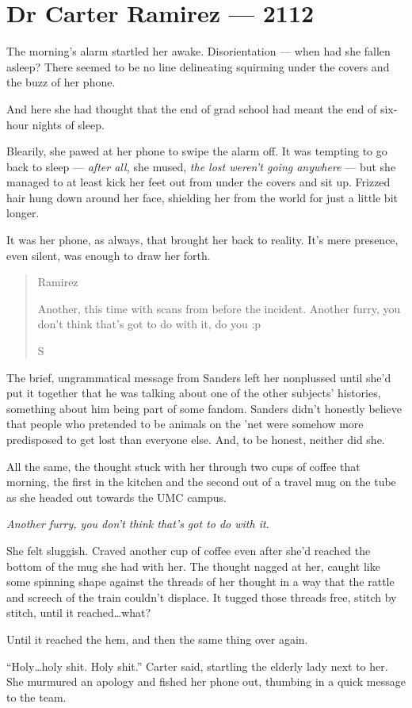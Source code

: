 \hypertarget{dr-carter-ramirez-2112}{%
\chapter*{Dr Carter Ramirez — 2112}\label{dr-carter-ramirez-2112}}

The morning's alarm startled her awake. Disorientation — when had she fallen asleep? There seemed to be no line delineating squirming under the covers and the buzz of her phone.

And here she had thought that the end of grad school had meant the end of six-hour nights of sleep.

Blearily, she pawed at her phone to swipe the alarm off. It was tempting to go back to sleep — \emph{after all,} she mused, \emph{the lost weren't going anywhere} — but she managed to at least kick her feet out from under the covers and sit up. Frizzed hair hung down around her face, shielding her from the world for just a little bit longer.

It was her phone, as always, that brought her back to reality. It's mere presence, even silent, was enough to draw her forth.

\begin{quote}
Ramirez

Another, this time with scans from before the incident. Another furry, you don't think that's got to do with it, do you :p

S
\end{quote}

The brief, ungrammatical message from Sanders left her nonplussed until she'd put it together that he was talking about one of the other subjects' histories, something about him being part of some fandom. Sanders didn't honestly believe that people who pretended to be animals on the 'net were somehow more predisposed to get lost than everyone else. And, to be honest, neither did she.

All the same, the thought stuck with her through two cups of coffee that morning, the first in the kitchen and the second out of a travel mug on the tube as she headed out towards the UMC campus.

\emph{Another furry, you don't think that's got to do with it}.

She felt sluggish. Craved another cup of coffee even after she'd reached the bottom of the mug she had with her. The thought nagged at her, caught like some spinning shape against the threads of her thought in a way that the rattle and screech of the train couldn't displace. It tugged those threads free, stitch by stitch, until it reached\ldots{}what?

Until it reached the hem, and then the same thing over again.

``Holy\ldots{}holy shit. Holy shit.'' Carter said, startling the elderly lady next to her. She murmured an apology and fished her phone out, thumbing in a quick message to the team.
